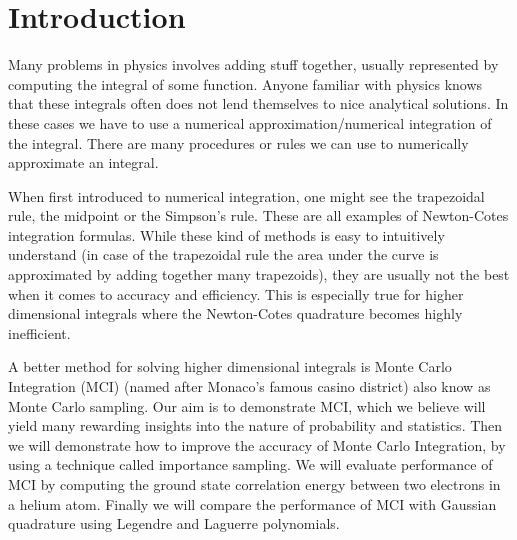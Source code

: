 \section{Introduction}
Many problems in physics involves adding stuff together, usually represented by
computing the integral of some function. Anyone familiar with physics knows that
these integrals often does not lend themselves to nice analytical solutions. In
these cases we have to use a numerical approximation/numerical integration of the integral.  
There are many procedures or rules we can use to numerically approximate an
integral. 

When first introduced to numerical integration, one might see the trapezoidal
rule, the midpoint or the Simpson's rule. These are all examples of
Newton-Cotes integration formulas. While these kind of methods is easy to
intuitively understand (in case of the trapezoidal rule the area under the curve
is approximated by adding together many trapezoids), they are usually not the
best when it comes to accuracy and efficiency. This is especially true for
higher dimensional integrals where the Newton-Cotes quadrature becomes highly
inefficient. 

A better method for solving higher dimensional integrals is Monte Carlo
Integration (MCI) (named after Monaco's famous casino district) also know as
Monte Carlo sampling.  
Our aim is to demonstrate MCI, which we believe will yield
many rewarding insights into the nature of probability and statistics. Then we
will demonstrate how to improve the accuracy of Monte Carlo Integration, by
using a technique called importance sampling. We will evaluate
performance of MCI by computing the ground state correlation
energy between two electrons in a helium atom. Finally we will compare the
performance of MCI with Gaussian quadrature using Legendre and Laguerre
polynomials.   

